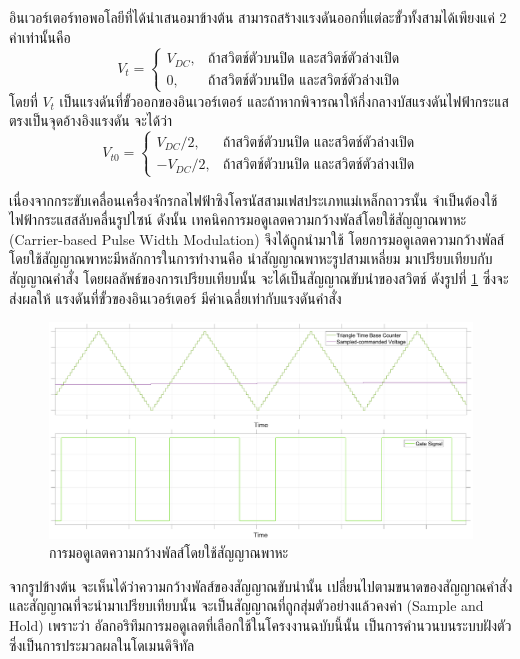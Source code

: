 \documentclass[11pt,a4paper]{article}
\begin{document}
อินเวอร์เตอร์ทอพอโลยีที่ได้นำเสนอมาข้างต้น สามารถสร้างแรงดันออกที่แต่ละขั้วทั้งสามได้เพียงแค่ 2 ค่าเท่านั้นคือ
\begin{equation}
    V_t = \begin{cases}
        V_{DC}, & \text{ถ้าสวิตช์ตัวบนปิด และสวิตช์ตัวล่างเปิด} \\
        0,      & \text{ถ้าสวิตช์ตัวบนปิด และสวิตช์ตัวล่างเปิด}
    \end{cases}
\end{equation}
โดยที่ $V_t$ เป็นแรงดันที่ขั้วออกของอินเวอร์เตอร์
และถ้าหากพิจารณาให้กึ่งกลางบัสแรงดันไฟฟ้ากระแสตรงเป็นจุดอ้างอิงแรงดัน จะได้ว่า
\begin{equation}
    V_{t0} = \begin{cases}
        V_{DC}/2,  & \text{ถ้าสวิตช์ตัวบนปิด และสวิตช์ตัวล่างเปิด} \\
        -V_{DC}/2, & \text{ถ้าสวิตช์ตัวบนปิด และสวิตช์ตัวล่างเปิด}
    \end{cases}
\end{equation}

เนื่องจากกระขับเคลื่อนเครื่องจักรกลไฟฟ้าซิงโครนัสสามเฟสประเภทแม่เหล็กถาวรนั้น จำเป็นต้องใช้ไฟฟ้ากระแสสลับคลื่นรูปไซน์ ดังนั้น เทคนิคการมอดูเลตความกว้างพัลส์โดยใช้สัญญาณพาหะ (Carrier-based Pulse Width Modulation) จึงได้ถูกนำมาใช้ โดยการมอดูเลตความกว้างพัลส์โดยใช้สัญญาณพาหะมีหลักการในการทำงานคือ นำสัญญาณพาหะรูปสามเหลี่ยม มาเปรียบเทียบกับสัญญาณคำสั่ง โดยผลลัพธ์ของการเปรียบเทียบนั้น จะได้เป็นสัญญาณขับนำของสวิตช์ ดังรูปที่ \ref{cbpwm} ซึ่งจะส่งผลให้ แรงดันที่ขั้วของอินเวอร์เตอร์ มีค่าเฉลี่ยเท่ากับแรงดันคำสั่ง

\begin{figure}[!h]
    \includegraphics[width=\textwidth]{spwm.eps}
    \caption{การมอดูเลตความกว้างพัลส์โดยใช้สัญญาณพาหะ}
    \label{cbpwm}
\end{figure}

จากรูปข้างต้น จะเห็นได้ว่าความกว้างพัลส์ของสัญญาณขับนำนั้น เปลี่ยนไปตามขนาดของสัญญาณคำสั่ง และสัญญาณที่จะนำมาเปรียบเทียบนั้น จะเป็นสัญญาณที่ถูกสุ่มตัวอย่างแล้วคงค่า (Sample and Hold) เพราะว่า อัลกอริทึมการมอดูเลตที่เลือกใช้ในโครงงานฉบับนี้นั้น เป็นการคำนวนบนระบบฝังตัว ซึ่งเป็นการประมวลผลในโดเมนดิจิทัล
\end{document}
